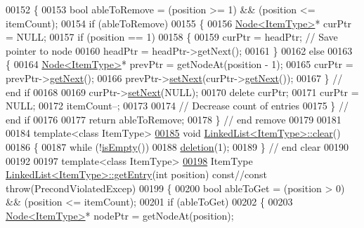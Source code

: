 \begin{DoxyCode}
00152 \{
00153        \textcolor{keywordtype}{bool} ableToRemove = (position >= 1) && (position <= itemCount);
00154        \textcolor{keywordflow}{if} (ableToRemove)
00155        \{
00156           \hyperlink{classNode}{Node<ItemType>}* curPtr = NULL;
00157           \textcolor{keywordflow}{if} (position == 1)
00158           \{
00159              curPtr = headPtr; \textcolor{comment}{// Save pointer to node}
00160              headPtr = headPtr->getNext();
00161           \}
00162           \textcolor{keywordflow}{else}
00163           \{
00164              \hyperlink{classNode}{Node<ItemType>}* prevPtr = getNodeAt(position - 1);
00165              curPtr = prevPtr->\hyperlink{classNode_a3eb0c96e03a3fd46ea1cff4c305bbedd}{getNext}();
00166              prevPtr->\hyperlink{classNode_a01c1a66d4e39f5b149e090413deb4633}{setNext}(curPtr->\hyperlink{classNode_a3eb0c96e03a3fd46ea1cff4c305bbedd}{getNext}());
00167           \}  \textcolor{comment}{// end if}
00168       
00169           curPtr->\hyperlink{classNode_a01c1a66d4e39f5b149e090413deb4633}{setNext}(NULL);
00170           \textcolor{keyword}{delete} curPtr;
00171           curPtr = NULL;
00172           itemCount--; 
00173       
00174  \textcolor{comment}{// Decrease count of entries}
00175    \}  \textcolor{comment}{// end if}
00176    
00177    \textcolor{keywordflow}{return} ableToRemove;
00178 \}  \textcolor{comment}{// end remove}
00179 
00181 
00184 \textcolor{keyword}{template}<\textcolor{keyword}{class} ItemType>
\hyperlink{classLinkedList_a7d1d9cf83eef67b6c4d700a3cc5970e1}{00185} \textcolor{keywordtype}{void} \hyperlink{classLinkedList_a7d1d9cf83eef67b6c4d700a3cc5970e1}{LinkedList<ItemType>::clear}()
00186 \{
00187    \textcolor{keywordflow}{while} (!\hyperlink{classLinkedList_a008e916c3d51d28b4cc9c8cdf3e9d921}{isEmpty}())
00188       \hyperlink{classLinkedList_a7dc3cca217b45c6fe5d28c9d16b7bf9e}{deletion}(1);
00189 \}  \textcolor{comment}{// end clear}
00190 
00192 
00197 \textcolor{keyword}{template}<\textcolor{keyword}{class} ItemType>
\hyperlink{classLinkedList_a341bfd7772c9d24d29eb7a7f3936915b}{00198} ItemType \hyperlink{classLinkedList_a341bfd7772c9d24d29eb7a7f3936915b}{LinkedList<ItemType>::getEntry}(\textcolor{keywordtype}{int} position) \textcolor{keyword}{const}\textcolor{comment}{//const
       throw(PrecondViolatedExcep)}
00199 \{
00200    \textcolor{keywordtype}{bool} ableToGet = (position > 0) && (position <= itemCount);
00201    \textcolor{keywordflow}{if} (ableToGet)
00202    \{
00203       \hyperlink{classNode}{Node<ItemType>}* nodePtr = getNodeAt(position);

\end{DoxyCode}
